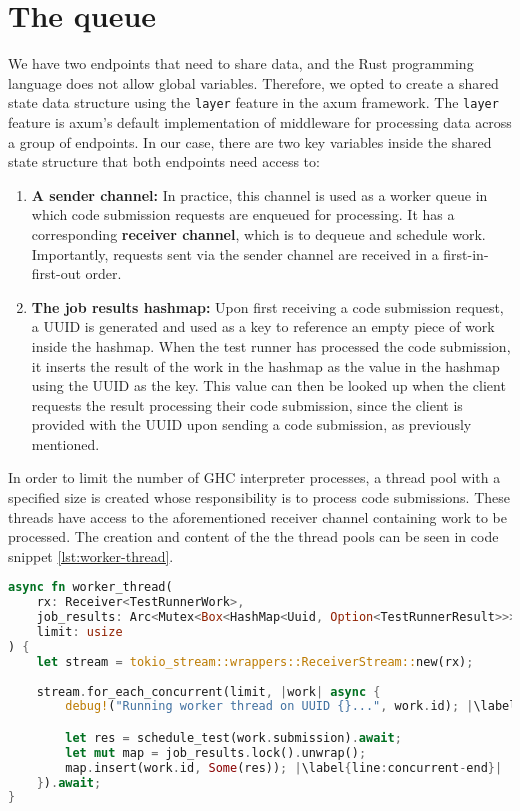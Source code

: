\section{The queue}
We have two endpoints that need to share data, and the Rust programming language does not allow global variables.
Therefore, we opted to create a shared state data structure using the \texttt{layer} feature in the axum framework.
The \texttt{layer} feature is axum's default implementation of middleware for processing data across a group of endpoints.
In our case, there are two key variables inside the shared state structure that both endpoints need access to:
\begin{enumerate}
    \item \textbf{A sender channel:} In practice, this channel is used as a worker queue in which code submission requests are enqueued for processing. It has a corresponding \textbf{receiver channel}, which is to dequeue and schedule work. Importantly, requests sent via the sender channel are received in a first-in-first-out order.
    \item \textbf{The job results hashmap:} Upon first receiving a code submission request, a UUID is generated and used as a key to reference an empty piece of work inside the hashmap. When the test runner has processed the code submission, it inserts the result of the work in the hashmap as the value in the hashmap using the UUID as the key. This value can then be looked up when the client requests the result processing their code submission, since the client is provided with the UUID upon sending a code submission, as previously mentioned.
\end{enumerate}

In order to limit the number of GHC interpreter processes, a thread pool with a specified size is created whose responsibility is to process code submissions.
These threads have access to the aforementioned receiver channel containing work to be processed.
The creation and content of the the thread pools can be seen in code snippet \ref{lst:worker-thread}.

\begin{lstlisting}[language=rust, escapechar=|, caption={Rust code showing allocation of thread pools and scheduling of code submission processing.}, label={lst:worker-thread}]
async fn worker_thread(
    rx: Receiver<TestRunnerWork>,
    job_results: Arc<Mutex<Box<HashMap<Uuid, Option<TestRunnerResult>>>>>,
    limit: usize
) {
    let stream = tokio_stream::wrappers::ReceiverStream::new(rx);
    
    stream.for_each_concurrent(limit, |work| async {
        debug!("Running worker thread on UUID {}...", work.id); |\label{line:concurrent-start}|

        let res = schedule_test(work.submission).await;
        let mut map = job_results.lock().unwrap();
        map.insert(work.id, Some(res)); |\label{line:concurrent-end}|
    }).await;
}
\end{lstlisting}

